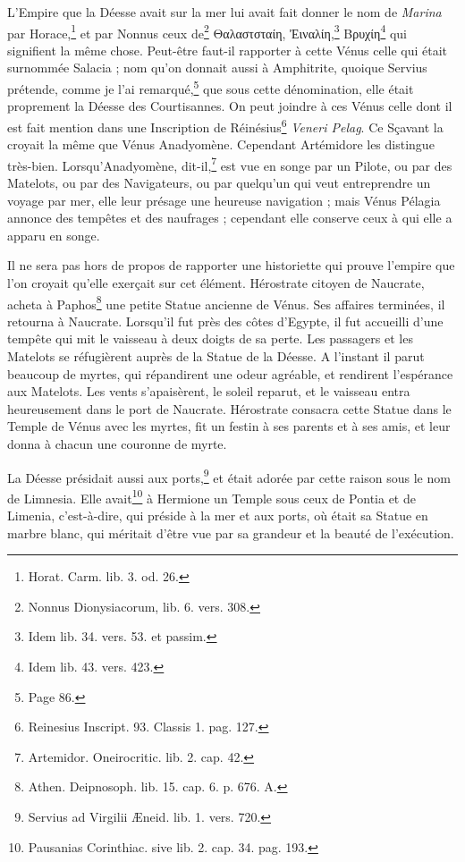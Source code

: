 \documentclass[a4paper, 18pt, oneside]{article}
\begin{document}
L'Empire que la Déesse avait sur la mer lui avait fait donner le nom de \emph{Marina} par Horace,\footnote{Horat. Carm. lib. 3. od. 26.} et par Nonnus ceux de\footnote{Nonnus Dionysiacorum, lib. 6. vers. 308.} Θαλαστσταίη, Ἐιναλίη,\footnote{Idem lib. 34. vers. 53. et passim.} Βρυχίη\footnote{Idem lib. 43. vers. 423.} qui signifient la même chose. Peut-être faut-il rapporter à cette Vénus celle qui était surnommée Salacia ; nom qu'on donnait aussi à Amphitrite, quoique Servius prétende, comme je l'ai remarqué,\footnote{Page 86.} que sous cette dénomination, elle était proprement la Déesse des Courtisannes. On peut joindre à ces Vénus celle dont il est fait mention dans une Inscription de Réinésius\footnote{Reinesius Inscript. 93. Classis 1. pag. 127.} \emph{Veneri Pelag}. Ce Sçavant la croyait la même que Vénus Anadyomène. Cependant Artémidore les distingue très-bien. Lorsqu'Anadyomène, dit-il,\footnote{Artemidor. Oneirocritic. lib. 2. cap. 42.} est vue en songe par un Pilote, ou par des Matelots, ou par des Navigateurs, ou par quelqu'un qui veut entreprendre un voyage par mer, elle leur présage une heureuse navigation ; mais Vénus Pélagia annonce des tempêtes et des naufrages ; cependant elle conserve ceux à qui elle a apparu en songe.

Il ne sera pas hors de propos de rapporter une historiette qui prouve l'empire que l'on croyait qu'elle exerçait sur cet élément. Hérostrate citoyen de Naucrate, acheta à Paphos\footnote{Athen. Deipnosoph. lib. 15. cap. 6. p. 676. A.} une petite Statue ancienne de Vénus. Ses affaires terminées, il retourna à Naucrate. Lorsqu'il fut près des côtes d'Egypte, il fut accueilli d'une tempête qui mit le vaisseau à deux doigts de sa perte. Les passagers et les Matelots se réfugièrent auprès de la Statue de la Déesse. A l'instant il parut beaucoup de myrtes, qui répandirent une odeur agréable, et rendirent l'espérance aux Matelots. Les vents s'apaisèrent, le soleil reparut, et le vaisseau entra heureusement dans le port de Naucrate. Hérostrate consacra cette Statue dans le Temple de Vénus avec les myrtes, fit un festin à ses parents et à ses amis, et leur donna à chacun une couronne de myrte.

La Déesse présidait aussi aux ports,\footnote{Servius ad Virgilii Æneid. lib. 1. vers. 720.} et était adorée par cette raison sous le nom de Limnesia. Elle avait\footnote{Pausanias Corinthiac. sive lib. 2. cap. 34. pag. 193.} à Hermione un Temple sous ceux de Pontia et de Limenia, c'est-à-dire, qui préside à la mer et aux ports, où était sa Statue en marbre blanc, qui méritait d'être vue par sa grandeur et la beauté de l'exécution.
\end{document}
